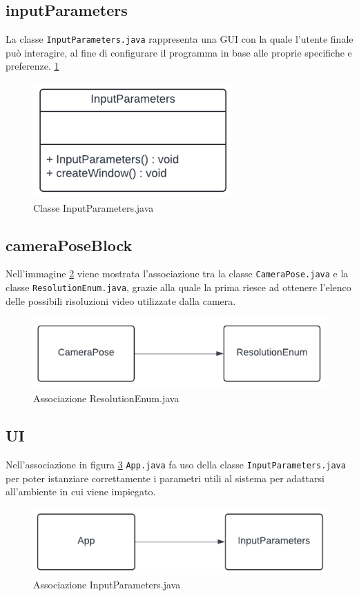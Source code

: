 \documentclass[12pt,a4paper,openright,twoside]{book}
\begin{document}
\subsection{inputParameters}
La classe \texttt{InputParameters.java} rappresenta una GUI con la quale l'utente finale può interagire, al fine di configurare il programma in base alle proprie specifiche e preferenze. \ref{fig:input_parameters}
\begin{figure}
	\centering
	\includegraphics[width=0.5\linewidth]{./figures/UML/inputParameters.png}
	\caption{Classe InputParameters.java}
	\label{fig:input_parameters}
\end{figure}
\subsection{cameraPoseBlock}
Nell'immagine \ref{fig:camera_pose_block} viene mostrata l'associazione tra la classe \texttt{CameraPose.java} e la classe \texttt{ResolutionEnum.java}, grazie alla quale la prima riesce ad ottenere l'elenco delle possibili risoluzioni video utilizzate dalla camera.
\begin{figure}
	\centering
	\includegraphics[width=0.5\linewidth]{./figures/UML/cameraPoseBlock.png}
	\caption{Associazione ResolutionEnum.java}
	\label{fig:camera_pose_block}
\end{figure}
\subsection{UI}
Nell'associazione in figura \ref{fig:UI} \texttt{App.java} fa uso della classe \texttt{InputParameters.java} per poter istanziare correttamente i parametri utili al sistema per adattarsi all'ambiente in cui viene impiegato.
\begin{figure}
	\centering
	\includegraphics[width=0.5\linewidth]{./figures/UML/UI.png}
	\caption{Associazione InputParameters.java}
	\label{fig:UI}
\end{figure}
\end{document}
